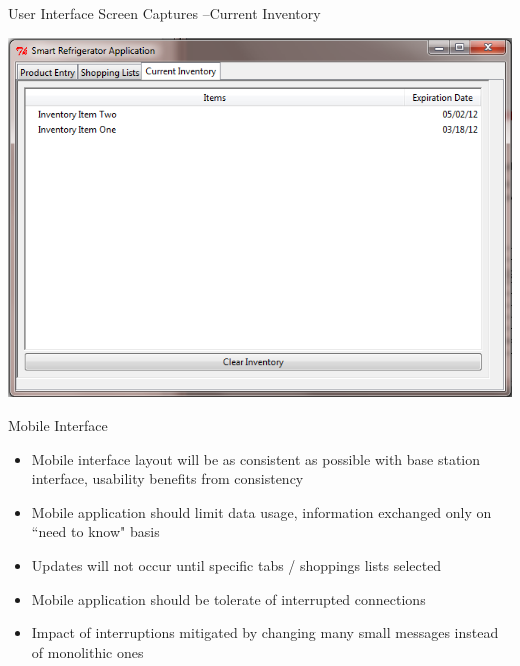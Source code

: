 \documentclass[t]{beamer}
\begin{document}
\begin{frame}{User Interface Screen Captures --Current Inventory}
\begin{center}
\includegraphics[scale=0.40]{../Graphics/Screenshot3}
\end{center}
\end{frame}

\begin{frame}{Mobile Interface}
\begin{itemize}
\item Mobile interface layout will be as consistent as possible with base station interface, usability benefits from consistency
\item Mobile application should limit data usage, information exchanged only on ``need to know" basis
\item Updates will not occur until specific tabs / shoppings lists selected
\item Mobile application should be tolerate of interrupted connections
\item Impact of interruptions mitigated by changing many small messages instead of monolithic ones
\end{itemize}
\end{frame}
\end{document}
